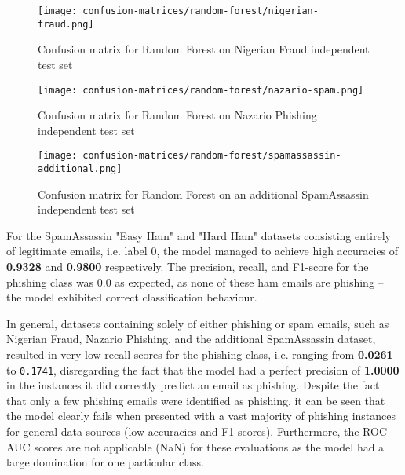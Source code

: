 \begin{figure}[H]
  \begin{center}
    \texttt{[image: confusion-matrices/random-forest/nigerian-fraud.png]}
    \caption{Confusion matrix for Random Forest on Nigerian Fraud independent test set}
  \end{center}
\end{figure}

\begin{figure}[H]
  \begin{center}
    \texttt{[image: confusion-matrices/random-forest/nazario-spam.png]}
    \caption{Confusion matrix for Random Forest on Nazario Phishing independent test set}
  \end{center}
\end{figure}

\begin{figure}[H]
  \begin{center}
    \texttt{[image: confusion-matrices/random-forest/spamassassin-additional.png]}
    \caption{Confusion matrix for Random Forest on an additional SpamAssassin  independent test set}
  \end{center}
\end{figure}

\noindent For the SpamAssassin "Easy Ham" and "Hard Ham" datasets consisting entirely of legitimate emails, i.e. label 0, the model managed to achieve high accuracies of \textbf{0.9328} and \textbf{0.9800} respectively. The precision, recall, and F1-score for the phishing class was 0.0 as expected, as none of these ham emails are phishing -- the model exhibited correct classification behaviour.\newline

\noindent In general, datasets containing solely of either phishing or spam emails, such as Nigerian Fraud, Nazario Phishing, and the additional SpamAssassin dataset, resulted in very low recall scores for the phishing class, i.e. ranging from \textbf{0.0261} to \texttt{0.1741}, disregarding the fact that the model had a perfect precision of \textbf{1.0000} in the instances it did correctly predict an email as phishing. Despite the fact that only a few phishing emails were identified as phishing, it can be seen that the model clearly fails when presented with a vast majority of phishing instances for general data sources (low accuracies and F1-scores). Furthermore, the ROC AUC scores are not applicable (NaN) for these evaluations as the model had a large domination for one particular class.

